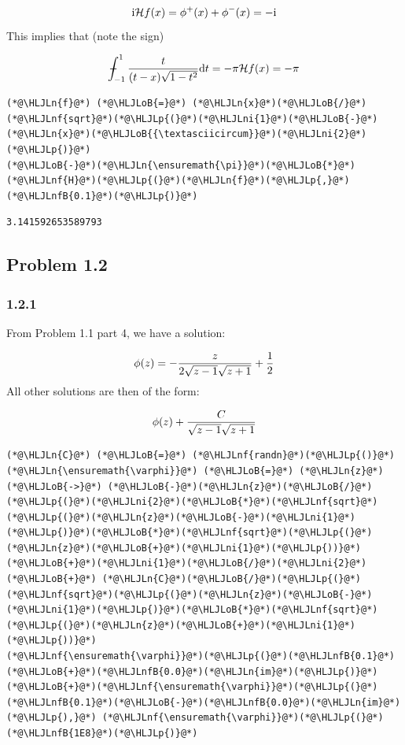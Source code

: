 \documentclass[12pt,a4paper]{article}
\newcommand{\HLJLn}[1]{#1}
\newcommand{\HLJLnf}[1]{\textcolor[RGB]{66,102,213}{#1}}
\newcommand{\HLJLnfB}[1]{\textcolor[RGB]{59,151,46}{#1}}
\newcommand{\HLJLni}[1]{\textcolor[RGB]{59,151,46}{#1}}
\newcommand{\HLJLoB}[1]{\textcolor[RGB]{102,102,102}{\textbf{#1}}}
\newcommand{\HLJLp}[1]{#1}
\def\D{ {\rm d} }
\def\I{ {\rm i} }
\def\HH{ {\cal H} }
\def\Xint#1{ \mathchoice
   {\XXint\displaystyle\textstyle{#1} }%
   {\XXint\textstyle\scriptstyle{#1} }%
   {\XXint\scriptstyle\scriptscriptstyle{#1} }%
   {\XXint\scriptscriptstyle\scriptscriptstyle{#1} }%
   \!\int}
\def\XXint#1#2#3{ {\setbox0=\hbox{$#1{#2#3}{\int}$}
     \vcenter{\hbox{$#2#3$}}\kern-.5\wd0} }
\def\dashint{\Xint-}
\def\dt{\D t}
\begin{document}
\[
\I{\cal H}f(x) = \phi^+(x) + \phi^-(x) = -\I
\]
This implies that (note the sign)

\[
\dashint_{-1}^1 {t \over (t-x) \sqrt{1-t^2}} \dt = -\pi \HH f(x) = -\pi
\]

\begin{lstlisting}
(*@\HLJLn{f}@*) (*@\HLJLoB{=}@*) (*@\HLJLn{x}@*)(*@\HLJLoB{/}@*)(*@\HLJLnf{sqrt}@*)(*@\HLJLp{(}@*)(*@\HLJLni{1}@*)(*@\HLJLoB{-}@*)(*@\HLJLn{x}@*)(*@\HLJLoB{{\textasciicircum}}@*)(*@\HLJLni{2}@*)(*@\HLJLp{)}@*)
(*@\HLJLoB{-}@*)(*@\HLJLn{\ensuremath{\pi}}@*)(*@\HLJLoB{*}@*)(*@\HLJLnf{H}@*)(*@\HLJLp{(}@*)(*@\HLJLn{f}@*)(*@\HLJLp{,}@*) (*@\HLJLnfB{0.1}@*)(*@\HLJLp{)}@*)
\end{lstlisting}

\begin{lstlisting}
3.141592653589793
\end{lstlisting}


\subsection{Problem 1.2}
\subsubsection{1.2.1}
From Problem 1.1 part 4, we have a solution: 

\[
\phi(z) = -{ z  \over 2 \sqrt{z -1} \sqrt{z+1}} + {1 \over 2}
\]
All other solutions are then of the form:

\[
\phi(z) + {C \over \sqrt{z-1} \sqrt{z+1}}
\]

\begin{lstlisting}
(*@\HLJLn{C}@*) (*@\HLJLoB{=}@*) (*@\HLJLnf{randn}@*)(*@\HLJLp{()}@*)
(*@\HLJLn{\ensuremath{\varphi}}@*) (*@\HLJLoB{=}@*) (*@\HLJLn{z}@*) (*@\HLJLoB{->}@*) (*@\HLJLoB{-}@*)(*@\HLJLn{z}@*)(*@\HLJLoB{/}@*)(*@\HLJLp{(}@*)(*@\HLJLni{2}@*)(*@\HLJLoB{*}@*)(*@\HLJLnf{sqrt}@*)(*@\HLJLp{(}@*)(*@\HLJLn{z}@*)(*@\HLJLoB{-}@*)(*@\HLJLni{1}@*)(*@\HLJLp{)}@*)(*@\HLJLoB{*}@*)(*@\HLJLnf{sqrt}@*)(*@\HLJLp{(}@*)(*@\HLJLn{z}@*)(*@\HLJLoB{+}@*)(*@\HLJLni{1}@*)(*@\HLJLp{))}@*)(*@\HLJLoB{+}@*)(*@\HLJLni{1}@*)(*@\HLJLoB{/}@*)(*@\HLJLni{2}@*) (*@\HLJLoB{+}@*) (*@\HLJLn{C}@*)(*@\HLJLoB{/}@*)(*@\HLJLp{(}@*)(*@\HLJLnf{sqrt}@*)(*@\HLJLp{(}@*)(*@\HLJLn{z}@*)(*@\HLJLoB{-}@*)(*@\HLJLni{1}@*)(*@\HLJLp{)}@*)(*@\HLJLoB{*}@*)(*@\HLJLnf{sqrt}@*)(*@\HLJLp{(}@*)(*@\HLJLn{z}@*)(*@\HLJLoB{+}@*)(*@\HLJLni{1}@*)(*@\HLJLp{))}@*)
(*@\HLJLnf{\ensuremath{\varphi}}@*)(*@\HLJLp{(}@*)(*@\HLJLnfB{0.1}@*)(*@\HLJLoB{+}@*)(*@\HLJLnfB{0.0}@*)(*@\HLJLn{im}@*)(*@\HLJLp{)}@*)(*@\HLJLoB{+}@*)(*@\HLJLnf{\ensuremath{\varphi}}@*)(*@\HLJLp{(}@*)(*@\HLJLnfB{0.1}@*)(*@\HLJLoB{-}@*)(*@\HLJLnfB{0.0}@*)(*@\HLJLn{im}@*)(*@\HLJLp{),}@*) (*@\HLJLnf{\ensuremath{\varphi}}@*)(*@\HLJLp{(}@*)(*@\HLJLnfB{1E8}@*)(*@\HLJLp{)}@*)
\end{lstlisting}
\end{document}
